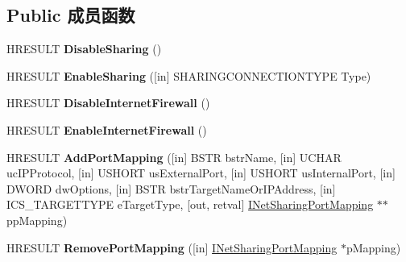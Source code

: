 \subsection*{Public 成员函数}
\begin{DoxyCompactItemize}
\item 
\mbox{\label{interface_i_net_sharing_configuration_a718ee373fb1d13f0180b41dd3081da6d}} 
H\+R\+E\+S\+U\+LT {\bfseries Disable\+Sharing} ()
\item 
\mbox{\label{interface_i_net_sharing_configuration_aca5fc3a9be8ded09ccd2b8c32d8951a2}} 
H\+R\+E\+S\+U\+LT {\bfseries Enable\+Sharing} (\mbox{[}in\mbox{]} S\+H\+A\+R\+I\+N\+G\+C\+O\+N\+N\+E\+C\+T\+I\+O\+N\+T\+Y\+PE Type)
\item 
\mbox{\label{interface_i_net_sharing_configuration_a41e17aa0ed971156632b3c96818eb966}} 
H\+R\+E\+S\+U\+LT {\bfseries Disable\+Internet\+Firewall} ()
\item 
\mbox{\label{interface_i_net_sharing_configuration_a9fa27da649a0dd3f9c4ca9393ee7a6e5}} 
H\+R\+E\+S\+U\+LT {\bfseries Enable\+Internet\+Firewall} ()
\item 
\mbox{\label{interface_i_net_sharing_configuration_abd4ac4b59db188173987064b16854887}} 
H\+R\+E\+S\+U\+LT {\bfseries Add\+Port\+Mapping} (\mbox{[}in\mbox{]} B\+S\+TR bstr\+Name, \mbox{[}in\mbox{]} U\+C\+H\+AR uc\+I\+P\+Protocol, \mbox{[}in\mbox{]} U\+S\+H\+O\+RT us\+External\+Port, \mbox{[}in\mbox{]} U\+S\+H\+O\+RT us\+Internal\+Port, \mbox{[}in\mbox{]} D\+W\+O\+RD dw\+Options, \mbox{[}in\mbox{]} B\+S\+TR bstr\+Target\+Name\+Or\+I\+P\+Address, \mbox{[}in\mbox{]} I\+C\+S\+\_\+\+T\+A\+R\+G\+E\+T\+T\+Y\+PE e\+Target\+Type, \mbox{[}out, retval\mbox{]} \hyperlink{interface_i_net_sharing_port_mapping}{I\+Net\+Sharing\+Port\+Mapping} $\ast$$\ast$pp\+Mapping)
\item 
\mbox{\label{interface_i_net_sharing_configuration_a8da103d4ada1619b442a1ed15f613d80}} 
H\+R\+E\+S\+U\+LT {\bfseries Remove\+Port\+Mapping} (\mbox{[}in\mbox{]} \hyperlink{interface_i_net_sharing_port_mapping}{I\+Net\+Sharing\+Port\+Mapping} $\ast$p\+Mapping)
\end{DoxyCompactItemize}
